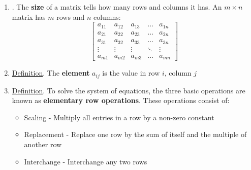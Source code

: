 \documentclass[12pt]{article}
\begin{document}
\begin{enumerate}
\begin{enumerate}
\vspace{5mm}

	\item\underline{}.
		The \textbf{size} of a matrix tells how many rows and columns it has.
		An $m\times n$ matrix has $m$ rows and $n$ columns:
			\[\begin{bmatrix}
				a_{11}	& a_{12}	& a_{13}	& \dots	& a_{1n}	\\
				a_{21}	& a_{22}	& a_{23}	& \dots	& a_{2n}	\\
				a_{31}	& a_{32}	& a_{33}	& \dots	& a_{3n}	\\
				\vdots	& \vdots	& \vdots	& \ddots	& \vdots	\\
				a_{m1}	& a_{m2}	& a_{m3}	& \dots	& a_{mn}
			\end{bmatrix}\]

	\item\underline{Definition}. The \textbf{element} $a_{ij}$ is the value in row $i$, column $j$

	\item\underline{Definition}.
		To solve the system of equations, the three basic operations are known as \textbf{elementary row operations}.
		These operations consist of:
		\begin{itemize}
		\item Scaling - Multiply all entries in a row by a non-zero constant
		\item Replacement - Replace one row by the sum of itself and the multiple of another row
		\item Interchange - Interchange any two rows
		\end{itemize}


\end{enumerate}
\end{enumerate}
\end{document}
